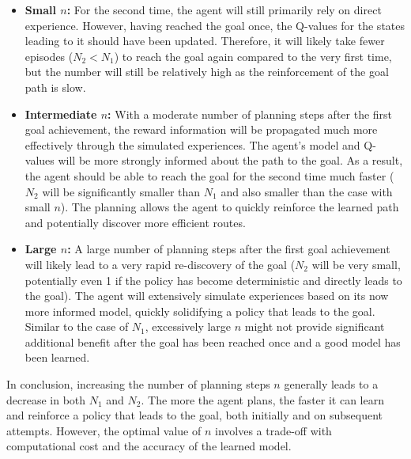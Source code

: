 \begin{itemize}
    \begin{itemize}
        \item \textbf{Small $n$:} For the second time, the agent will still primarily rely on direct experience. However, having reached the goal once, the Q-values for the states leading to it should have been updated. Therefore, it will likely take fewer episodes ($N_2 < N_1$) to reach the goal again compared to the very first time, but the number will still be relatively high as the reinforcement of the goal path is slow.
        \item \textbf{Intermediate $n$:} With a moderate number of planning steps after the first goal achievement, the reward information will be propagated much more effectively through the simulated experiences. The agent's model and Q-values will be more strongly informed about the path to the goal. As a result, the agent should be able to reach the goal for the second time much faster ($N_2$ will be significantly smaller than $N_1$ and also smaller than the case with small $n$). The planning allows the agent to quickly reinforce the learned path and potentially discover more efficient routes.
        \item \textbf{Large $n$:} A large number of planning steps after the first goal achievement will likely lead to a very rapid re-discovery of the goal ($N_2$ will be very small, potentially even 1 if the policy has become deterministic and directly leads to the goal). The agent will extensively simulate experiences based on its now more informed model, quickly solidifying a policy that leads to the goal. Similar to the case of $N_1$, excessively large $n$ might not provide significant additional benefit after the goal has been reached once and a good model has been learned.
    \end{itemize}
    
    In conclusion, increasing the number of planning steps $n$ generally leads to a decrease in both $N_1$ and $N_2$. The more the agent plans, the faster it can learn and reinforce a policy that leads to the goal, both initially and on subsequent attempts. However, the optimal value of $n$ involves a trade-off with computational cost and the accuracy of the learned model.
\end{itemize}

\vspace*{0.3cm}
